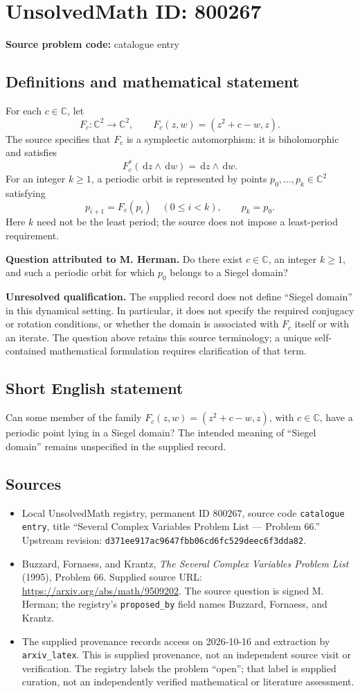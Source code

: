 \documentclass[11pt]{article}
\newcommand{\C}{\mathbb{C}}
\newcommand{\dd}{\,\mathrm{d}}
\begin{document}
\section*{UnsolvedMath ID: 800267}
\textbf{Source problem code:} catalogue entry
\subsection{Definitions and mathematical statement}
For each \(c\in\C\), let
\[
F_c:\C^2\longrightarrow\C^2,\qquad F_c(z,w)=(z^2+c-w,z).
\]
The source specifies that \(F_c\) is a symplectic automorphism: it is biholomorphic and satisfies
\[
F_c^*(\dd z\wedge\dd w)=\dd z\wedge\dd w.
\]
For an integer \(k\geq1\), a periodic orbit is represented by points \(p_0,\ldots,p_k\in\C^2\) satisfying
\[
p_{i+1}=F_c(p_i)\quad(0\leq i<k),\qquad p_k=p_0.
\]
Here \(k\) need not be the least period; the source does not impose a least-period requirement.

\textbf{Question attributed to M. Herman.} Do there exist \(c\in\C\), an integer \(k\geq1\), and such a periodic orbit for which \(p_0\) belongs to a Siegel domain?

\textbf{Unresolved qualification.} The supplied record does not define ``Siegel domain'' in this dynamical setting. In particular, it does not specify the required conjugacy or rotation conditions, or whether the domain is associated with \(F_c\) itself or with an iterate. The question above retains this source terminology; a unique self-contained mathematical formulation requires clarification of that term.
\subsection{Short English statement}
Can some member of the family \(F_c(z,w)=(z^2+c-w,z)\), with \(c\in\C\), have a periodic point lying in a Siegel domain? The intended meaning of ``Siegel domain'' remains unspecified in the supplied record.
\subsection{Sources}
\begin{itemize}
\item Local UnsolvedMath registry, permanent ID \(800267\), source code \texttt{catalogue entry}, title ``Several Complex Variables Problem List --- Problem 66.'' Upstream revision: \texttt{d371ee917ac9647fbb06cd6fc529deec6f3dda82}.
\item Buzzard, Fornaess, and Krantz, \emph{The Several Complex Variables Problem List} (1995), Problem 66. Supplied source URL: \url{https://arxiv.org/abs/math/9509202}. The source question is signed M. Herman; the registry's \texttt{proposed\_by} field names Buzzard, Fornaess, and Krantz.
\item The supplied provenance records access on 2026-10-16 and extraction by \texttt{arxiv\_latex}. This is supplied provenance, not an independent source visit or verification. The registry labels the problem ``open''; that label is supplied curation, not an independently verified mathematical or literature assessment.
\end{itemize}
\end{document}
